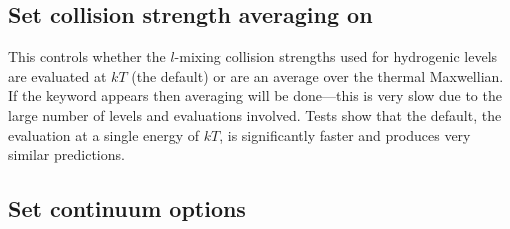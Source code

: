 \subsection{Set collision strength averaging on}

This controls whether the $l$-mixing collision strengths
used for hydrogenic
levels are evaluated at $kT$ (the default) or are an average over
the thermal Maxwellian.
If the keyword  appears then averaging will be
done---this
is very slow due to the large number of levels and evaluations involved.
Tests show that the default, the evaluation at a single energy of $kT$, is
significantly faster and produces very similar predictions.

\subsection{Set continuum options }
\label{sec:CommandSetContinuumOptions}
